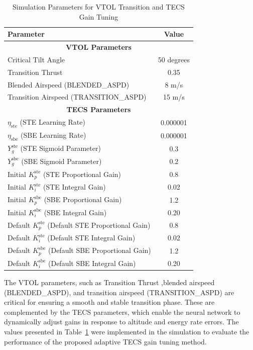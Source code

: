 \documentclass[journal,article,submit,pdftex,moreauthors]{Definitions/mdpi}
\begin{document}
\begin{table}[h]
    \centering
    \caption{Simulation Parameters for VTOL Transition and TECS Gain Tuning}
    \label{tab:simulation_parameters}
    \begin{tabular}{|l|c|}
        \hline
        \textbf{Parameter} & \textbf{Value} \\
        \hline
        \multicolumn{2}{|c|}{\textbf{VTOL Parameters}} \\
        \hline
        Critical Tilt Angle & 50 degrees \\
        Transition Thrust & 0.35 \\
        Blended Airspeed (BLENDED\_ASPD) & 8 m/s \\
        Transition Airspeed (TRANSITION\_ASPD) & 15 m/s \\
        \hline
        \multicolumn{2}{|c|}{\textbf{TECS Parameters}} \\
        \hline
        $\eta_{\text{ste}}$ (STE Learning Rate) & 0.000001 \\
        $\eta_{\text{sbe}}$ (SBE Learning Rate) & 0.000001 \\
        $Y_g^{\text{ste}}$ (STE Sigmoid Parameter) & 0.3 \\
        $Y_g^{\text{sbe}}$ (SBE Sigmoid Parameter) & 0.2 \\
        Initial $K_p^{\text{ste}}$ (STE Proportional Gain) & 0.8 \\
        Initial $K_i^{\text{ste}}$ (STE Integral Gain) & 0.02 \\
        Initial $K_p^{\text{sbe}}$ (SBE Proportional Gain) & 1.2 \\
        Initial $K_i^{\text{sbe}}$ (SBE Integral Gain) & 0.20 \\
        Default $K_p^{\text{ste}}$ (Default STE Proportional Gain) & 0.8 \\
        Default $K_i^{\text{ste}}$ (Default STE Integral Gain) & 0.02 \\
        Default $K_p^{\text{sbe}}$ (Default SBE Proportional Gain) & 1.2 \\
        Default $K_i^{\text{sbe}}$ (Default SBE Integral Gain) & 0.20 \\
        \hline
    \end{tabular}
\end{table}

The VTOL parameters, such as Transition Thrust ,blended airspeed (BLENDED\_ASPD), and transition airspeed (TRANSITION\_ASPD) are critical for ensuring a smooth and stable transition phase. These are complemented by the TECS parameters, which enable the neural network to dynamically adjust gains in response to altitude and energy rate errors. The values presented in Table~\ref{tab:simulation_parameters} were implemented in the simulation to evaluate the performance of the proposed adaptive TECS gain tuning method.
\end{document}
